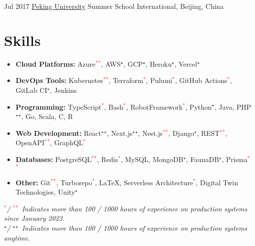 { \customcventry
 {Jul 2017}
 {\color{blue}\href{http://www.oir.pku.edu.cn/summerschool/}{Peking University}}
 {Summer School International,}
 {Beijing, China}
 {}{}
 {
 }
}

\section{Skills}
{
	\newcommand{\skilled}{\textcolor{black}{$^\star$}}
	\newcommand{\sskilled}{\skilled\skilled}
	\newcommand{\skilledRecent}{\textcolor{red}{$^*$}}
	\newcommand{\sskilledRecent}{\skilledRecent\skilledRecent}
			
	\begin{itemize}[label=\textbullet]
		\item {\textbf{Cloud Platforms:} Azure\sskilledRecent, AWS\skilled, GCP\skilled, Heroku\skilled, Vercel\skilled}
		\item {\textbf{DevOps Tools:} Kubernetes\sskilledRecent, Terraform\skilledRecent, Pulumi\skilledRecent, GitHub Actions\skilledRecent, GitLab CI\skilled, Jenkins}
		\item {\textbf{Programming:} TypeScript\skilledRecent, Bash\skilledRecent, RobotFramework\skilledRecent, Python\skilled, Java, PHP\sskilled, Go, Scala, C, R}
		\item {\textbf{Web Development:} React\sskilled, Next.js\sskilled, Nest.js\sskilledRecent, Django\skilled, REST\sskilledRecent, OpenAPI\sskilledRecent, GraphQL\skilledRecent}
		\item {\textbf{Databases:} PostgreSQL\sskilledRecent, Redis\skilledRecent, MySQL, MongoDB\skilled, FaunaDB\skilled, Prisma\sskilledRecent}
		\item {\textbf{Other:} Git\sskilledRecent, Turborepo\skilledRecent, LaTeX, Serverless Architecture\skilledRecent, Digital Twin Technologies, Unity\skilled}
	\end{itemize}
	{\footnotesize%
		\vspace{-2mm}%
		\emph{%
			\hspace*{4mm}\skilledRecent / \sskilledRecent~Indicates more than 100 / 1000 hours of experience on production systems since January 2023.
			} \\
		\emph{%
			\hspace*{4mm}\skilled / \sskilled~Indicates more than 100 / 1000 hours of experience on production systems anytime.}
	}
			        
}
    

